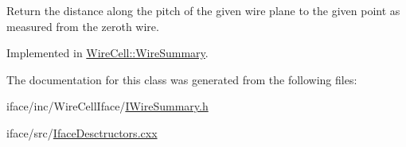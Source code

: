 Return the distance along the pitch of the given wire plane to the given point as measured from the zeroth wire. 

Implemented in \hyperlink{class_wire_cell_1_1_wire_summary_a61c1c383ee6b110a37609a3d892b01d2}{Wire\+Cell\+::\+Wire\+Summary}.



The documentation for this class was generated from the following files\+:\begin{DoxyCompactItemize}
\item 
iface/inc/\+Wire\+Cell\+Iface/\hyperlink{_i_wire_summary_8h}{I\+Wire\+Summary.\+h}\item 
iface/src/\hyperlink{_iface_desctructors_8cxx}{Iface\+Desctructors.\+cxx}\end{DoxyCompactItemize}
